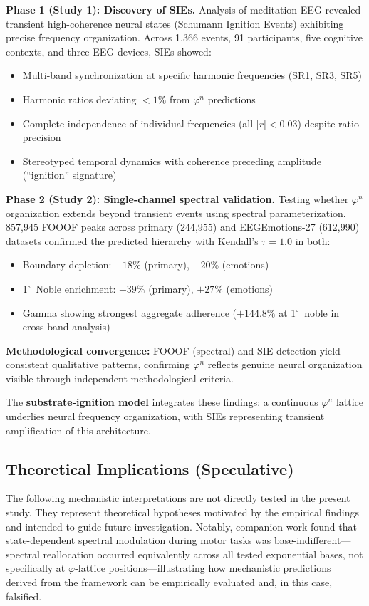 \documentclass[11pt,a4paper]{article}
\newcommand{\degree}{$^\circ$}  %
\newcommand{\phisym}{\varphi}
\begin{document}
\textbf{Phase 1 (Study 1): Discovery of SIEs.} Analysis of meditation EEG revealed transient high-coherence neural states (Schumann Ignition Events) exhibiting precise frequency organization. Across 1,366 events, 91 participants, five cognitive contexts, and three EEG devices, SIEs showed:
\begin{itemize}
    \item Multi-band synchronization at specific harmonic frequencies (SR1, SR3, SR5)
    \item Harmonic ratios deviating $<1\%$ from $\phisym^n$ predictions
    \item Complete independence of individual frequencies (all $|r| < 0.03$) despite ratio precision
    \item Stereotyped temporal dynamics with coherence preceding amplitude (``ignition'' signature)
\end{itemize}

\textbf{Phase 2 (Study 2): Single-channel spectral validation.} Testing whether $\phisym^n$ organization extends beyond transient events using spectral parameterization. 857,945 FOOOF peaks across primary (244,955) and EEGEmotions-27 (612,990) datasets confirmed the predicted hierarchy with Kendall's $\tau = 1.0$ in both:
\begin{itemize}
    \item Boundary depletion: $-18\%$ (primary), $-20\%$ (emotions)
    \item 1\degree\ Noble enrichment: $+39\%$ (primary), $+27\%$ (emotions)
    \item Gamma showing strongest aggregate adherence ($+144.8\%$ at 1\degree\ noble in cross-band analysis)
\end{itemize}

\textbf{Methodological convergence:} FOOOF (spectral) and SIE detection yield consistent qualitative patterns, confirming $\phisym^n$ reflects genuine neural organization visible through independent methodological criteria.

The \textbf{substrate-ignition model} integrates these findings: a continuous $\phisym^n$ lattice underlies neural frequency organization, with SIEs representing transient amplification of this architecture.

\subsection{Theoretical Implications (Speculative)}

The following mechanistic interpretations are not directly tested in the present study. They represent theoretical hypotheses motivated by the empirical findings and intended to guide future investigation. Notably, companion work \parencite{lacy2026eegmmidb} found that state-dependent spectral modulation during motor tasks was base-indifferent---spectral reallocation occurred equivalently across all tested exponential bases, not specifically at $\phisym$-lattice positions---illustrating how mechanistic predictions derived from the framework can be empirically evaluated and, in this case, falsified.
\end{document}
